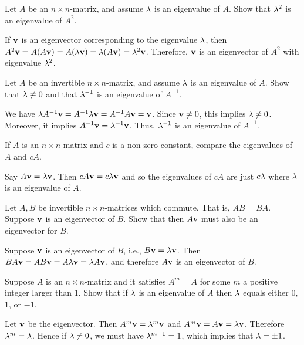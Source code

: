 \begin{ex}
  Let $A$ be an $n\times n$-matrix, and assume $\lambda$ is an
  eigenvalue of $A$. Show that $\lambda^2$ is an eigenvalue of
  $A^2$.
  \begin{sol}
    If $\vect{v}$ is an eigenvector corresponding to the eigenvalue
    $\lambda$, then $A^2\vect{v}=A(A\vect{v}) =
    A(\eigenvar\vect{v}) = \eigenvar(A\vect{v}) =
    \eigenvar^2\vect{v}$. Therefore, $\vect{v}$ is an eigenvector of
    $A^2$ with eigenvalue $\lambda^2$.
  \end{sol}
\end{ex}

\begin{ex}
  Let $A$ be an invertible $n\times n$-matrix, and assume $\lambda$
  is an eigenvalue of $A$. Show that $\lambda\neq 0$ and that
  $\lambda^{-1}$ is an eigenvalue of $A^{-1}$.
  \begin{sol}
    We have
    $\eigenvar A^{-1}\vect{v} = A^{-1}\eigenvar\vect{v} =
    A^{-1}A\vect{v} = \vect{v}$. Since $\vect{v}\neq 0$, this implies
    $\lambda\neq 0$. Moreover, it implies
    $A^{-1}\vect{v} = \eigenvar^{-1}\vect{v}$. Thus, $\lambda^{-1}$
    is an eigenvalue of $A^{-1}$.
  \end{sol}
\end{ex}

\begin{ex}
  If $A$ is an $n\times n$-matrix and $c$ is a non-zero constant,
  compare the eigenvalues of $A$ and $cA$.
  \begin{sol}
    Say $A\vect{v}=\eigenvar \vect{v}$. Then
    $cA\vect{v}=c\eigenvar \vect{v}$ and so the eigenvalues of $cA$ are
    just $c\lambda$ where $\lambda$ is an eigenvalue of $A$.
  \end{sol}
\end{ex}

\begin{ex}
  Let $A,B$ be invertible $n\times n$-matrices which commute. That is,
  $AB=BA$. Suppose $\vect{v}$ is an eigenvector of $B$. Show that then
  $A\vect{v}$ must also be an eigenvector for $B$.
  \begin{sol}
    Suppose $\vect{v}$ is an eigenvector of $B$, i.e.,
    $B\vect{v}=\eigenvar \vect{v}$. Then
    $BA\vect{v}=AB\vect{v} =A\eigenvar \vect{v}=\eigenvar A\vect{v}$,
    and therefore $A\vect{v}$ is an eigenvector of $B$.
  \end{sol}
\end{ex}

\begin{ex}
  Suppose $A$ is an $n\times n$-matrix and it satisfies $A^m=A$ for
  some $m$ a positive integer larger than 1. Show that if $\lambda$
  is an eigenvalue of $A$ then $\lambda$ equals either $0$, $1$, or
  $-1$.
  \begin{sol}
    Let $\vect{v}$ be the eigenvector. Then
    $A^m\vect{v}=\eigenvar^m\vect{v}$ and
    $A^m\vect{v}=A\vect{v}=\eigenvar\vect{v}$. Therefore
    $\lambda^m=\lambda$. Hence if $\lambda \neq 0$, we must
    have $\lambda^{m-1}=1$, which implies that $\lambda=\pm 1$.
  \end{sol}
\end{ex}

